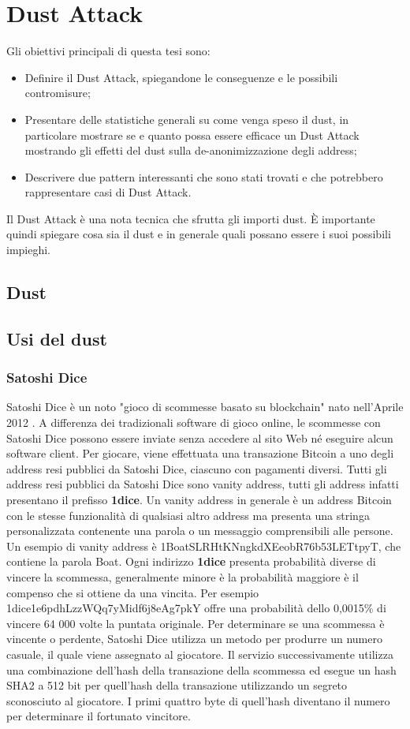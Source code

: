 \chapter{Dust Attack}
Gli obiettivi principali di questa tesi sono:
\begin{itemize}
\item Definire il Dust Attack, spiegandone le conseguenze e le possibili contromisure;
    \item Presentare delle statistiche generali su come venga speso il dust, in particolare mostrare se e quanto possa essere efficace un Dust Attack mostrando gli effetti del dust sulla de-anonimizzazione degli address;
    \item Descrivere due pattern interessanti che sono stati trovati e che potrebbero rappresentare casi di Dust Attack.
\end{itemize}
Il Dust Attack è una nota tecnica che sfrutta gli importi dust. È importante quindi spiegare cosa sia il dust e in generale quali possano essere i suoi possibili impieghi.
\section{Dust}
\section{Usi del dust}
\subsection{Satoshi Dice}
Satoshi Dice è un noto "gioco di scommesse basato su blockchain" nato nell'Aprile 2012 \cite{SD}. A differenza dei tradizionali software di gioco online, le scommesse con Satoshi Dice possono essere inviate senza accedere al sito Web né eseguire alcun software client. Per giocare, viene effettuata una transazione Bitcoin a uno degli address resi pubblici da Satoshi Dice, ciascuno con pagamenti diversi. Tutti gli address resi pubblici da Satoshi Dice sono vanity address, tutti gli address infatti presentano il prefisso \textbf{1dice}. Un vanity address in generale è un address Bitcoin con le stesse funzionalità di qualsiasi altro address ma presenta una stringa personalizzata contenente una parola o un messaggio comprensibili alle persone. Un esempio di vanity address è 1BoatSLRHtKNngkdXEeobR76b53LETtpyT, che contiene la parola Boat. Ogni indirizzo \textbf{1dice} presenta probabilità diverse di vincere la scommessa, generalmente minore è la probabilità maggiore è il compenso che si ottiene da una vincita. Per esempio 1dice1e6pdhLzzWQq7yMidf6j8eAg7pkY offre una probabilità dello 0,0015\% di vincere 64 000 volte la puntata originale. Per determinare se una scommessa è vincente o perdente, Satoshi Dice utilizza un metodo per produrre un numero casuale, il quale viene assegnato al giocatore. Il servizio successivamente utilizza una combinazione dell'hash della transazione della scommessa ed esegue un hash SHA2 a 512 bit per quell'hash della transazione utilizzando un segreto sconosciuto al giocatore. I primi quattro byte di quell'hash diventano il numero per determinare il fortunato vincitore.

